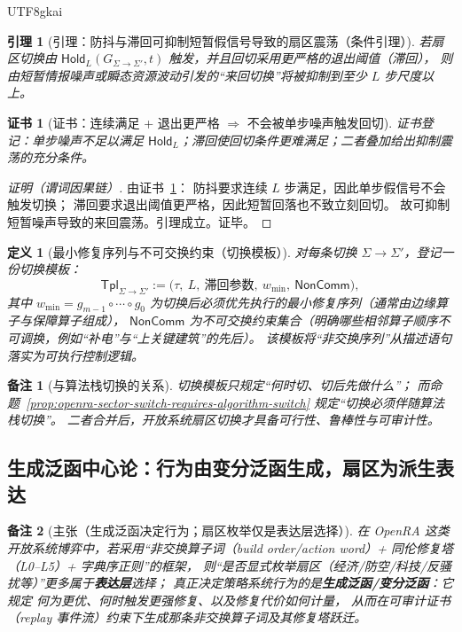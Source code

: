 \documentclass[12pt]{article}
\newtheorem{definition}{定义}[section]
\newtheorem{lemma}{引理}[section]
\newtheorem{remark}{备注}[section]
\newtheorem{Certificate}{证书}[section]
\begin{document}
\begin{CJK*}{UTF8}{gkai}
\begin{lemma}[引理：防抖与滞回可抑制短暂假信号导致的扇区震荡（条件引理）]
\label{lem:openra-debounce-hysteresis-reduces-chattering}
若扇区切换由 $\mathsf{Hold}_{L}(G_{\Sigma\to\Sigma'},t)$ 触发，并且回切采用更严格的退出阈值（滞回），
则由短暂情报噪声或瞬态资源波动引发的“来回切换”将被抑制到至少 $L$ 步尺度以上。
\end{lemma}

\begin{Certificate}[证书：连续满足 + 退出更严格 $\Rightarrow$ 不会被单步噪声触发回切]
\label{cert:openra-debounce-hysteresis-reduces-chattering}
证书登记：单步噪声不足以满足 $\mathsf{Hold}_{L}$；滞回使回切条件更难满足；二者叠加给出抑制震荡的充分条件。
\end{Certificate}

\begin{proof}[证明（谓词因果链）]
由证书~\ref{cert:openra-debounce-hysteresis-reduces-chattering}：
防抖要求连续 $L$ 步满足，因此单步假信号不会触发切换；
滞回要求退出阈值更严格，因此短暂回落也不致立刻回切。
故可抑制短暂噪声导致的来回震荡。引理成立。证毕。
\end{proof}

\begin{definition}[最小修复序列与不可交换约束（切换模板）]
对每条切换 $\Sigma\to\Sigma'$，登记一份切换模板：
\[
  \mathsf{Tpl}_{\Sigma\to\Sigma'}
  :=
  \bigl(
    \tau,\ L,\ \text{滞回参数},\ w_{\min},\ \mathsf{NonComm}
  \bigr),
\]
其中 $w_{\min}=g_{m-1}\circ\cdots\circ g_0$ 为切换后必须优先执行的最小修复序列（通常由边缘算子与保障算子组成），
$\mathsf{NonComm}$ 为不可交换约束集合（明确哪些相邻算子顺序不可调换，例如“补电”与“上关键建筑”的先后）。
该模板将“非交换序列”从描述语句落实为可执行控制逻辑。
\end{definition}

\begin{remark}[与算法栈切换的关系]
切换模板只规定“何时切、切后先做什么”；
而命题~\ref{prop:openra-sector-switch-requires-algorithm-switch} 规定“切换必须伴随算法栈切换”。
二者合并后，开放系统扇区切换才具备可行性、鲁棒性与可审计性。
\end{remark}

\subsection{生成泛函中心论：行为由变分泛函生成，扇区为派生表达}
\label{sec:openra-generating-functional-centrality}

\begin{remark}[主张（生成泛函决定行为；扇区枚举仅是表达层选择）]
在 \textsf{OpenRA} 这类开放系统博弈中，若采用“非交换算子词（build order/action word）+ 同伦修复塔（L0--L5）+ 字典序正则”的框架，
则“是否显式枚举扇区（经济/防空/科技/反骚扰等）”更多属于\textbf{表达层}选择；
真正决定策略系统行为的是\textbf{生成泛函/变分泛函}：它规定
何为更优、何时触发更强修复、以及修复代价如何计量，
从而在可审计证书（replay 事件流）约束下生成那条非交换算子词及其修复塔跃迁。
\end{remark}


\end{CJK*}
\end{document}
